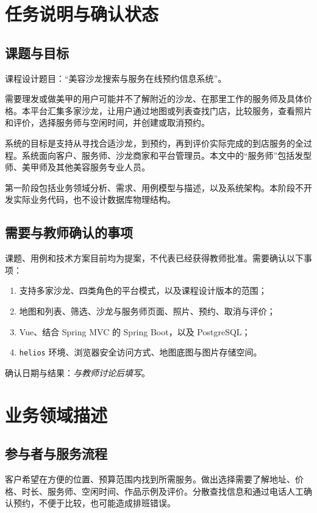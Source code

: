\section{任务说明与确认状态}
\subsection{课题与目标}
课程设计题目：“美容沙龙搜索与服务在线预约信息系统”。

需要理发或做美甲的用户可能并不了解附近的沙龙、在那里工作的服务师及具体价格。本平台汇集多家沙龙，让用户通过地图或列表查找门店，比较服务，查看照片和评价，选择服务师与空闲时间，并创建或取消预约。

系统的目标是支持从寻找合适沙龙，到预约，再到评价实际完成的到店服务的全过程。系统面向客户、服务师、沙龙商家和平台管理员。本文中的“服务师”包括发型师、美甲师及其他美容服务专业人员。

第一阶段包括业务领域分析、需求、用例模型与描述，以及系统架构。本阶段不开发实际业务代码，也不设计数据库物理结构。

\subsection{需要与教师确认的事项}
课题、用例和技术方案目前均为提案，不代表已经获得教师批准。需要确认以下事项：
\begin{enumerate}
\item 支持多家沙龙、四类角色的平台模式，以及课程设计版本的范围；
\item 地图和列表、筛选、沙龙与服务师页面、照片、预约、取消与评价；
\item Vue、结合 Spring MVC 的 Spring Boot，以及 PostgreSQL；
\item \texttt{helios} 环境、浏览器安全访问方式、地图底图与图片存储空间。
\end{enumerate}
确认日期与结果：\textit{与教师讨论后填写}。

\section{业务领域描述}
\subsection{参与者与服务流程}
客户希望在方便的位置、预算范围内找到所需服务。做出选择需要了解地址、价格、时长、服务师、空闲时间、作品示例及评价。分散查找信息和通过电话人工确认预约，不便于比较，也可能造成排班错误。

